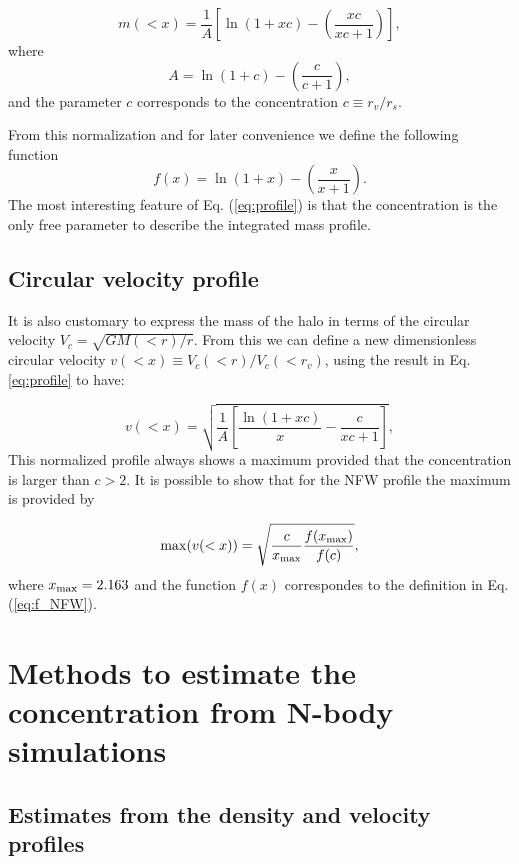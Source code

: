 \documentclass[a4,useAMS,usenatbib,usegraphicx]{mn2e}
\begin{document}
\begin{equation}
m(<x) =
\frac{1}{A}\left[\ln\left(1+xc\right)-\left(\frac{xc}{xc+1}\right)\right],
\label{eq:profile}
\end{equation}
%
where
%
\begin{equation}
A=\ln\left(1+c\right)-\left(\frac{c}{c+1}\right),
\end{equation}
%
and the parameter $c$ corresponds to the concentration $c\equiv r_v/r_s$.

From this normalization and for later convenience we define the
following function
%
\begin{equation}
f(x) = \ln\left(1+x\right)-\left(\frac{x}{x+1}\right).
\label{eq:f_NFW}
\end{equation}
%
The most interesting feature of Eq. (\ref{eq:profile}) is that the
concentration is the only free parameter to describe the integrated
mass profile.
 
\subsection{Circular velocity profile}

It is also customary to express the mass of the halo in terms of the
circular velocity $V_{c}=\sqrt{GM(<r)/r}$.
From this we can define a new dimensionless circular velocity $v(<x)\equiv
V_{c}(<r)/V_{c}(<r_v)$, using the result in Eq. \ref{eq:profile}
to have:

\begin{equation}
v(<x)=\sqrt{\frac{1}{A}\left[\frac{\ln\left(1+xc\right)}{x}-\frac{c}{xc+1}\right]},
\end{equation}
%
This normalized profile always shows a maximum provided that the
concentration is larger than $c>2$.
It is possible to show that for the NFW profile the maximum is
provided by

\begin{equation}
\mathrm{max}(v(<x)) = \sqrt{\frac{c}{x_{\rm max}}\frac{f(x_{\rm
      max})}{f(c)}},
\label{eq:max_v}
\end{equation}
where $x_{\rm max}=2.163$ \citep{Klypin2014} and the function $f(x)$
correspondes to the definition in Eq. (\ref{eq:f_NFW}).

\section{Methods to estimate the concentration from N-body simulations}
\label{sec:method}

\subsection{Estimates from the density and velocity profiles}
\end{document}
